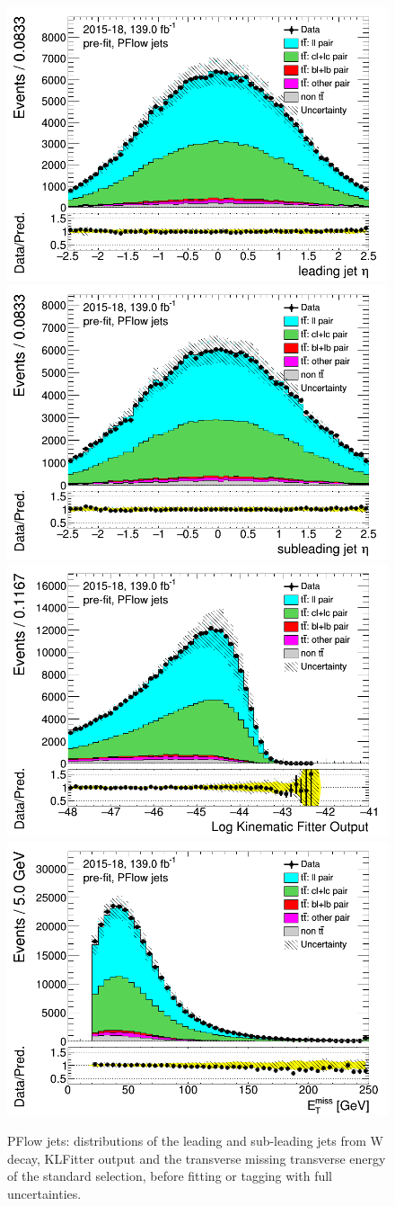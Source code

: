 \documentclass[letterpaper,12pt]{article}
\begin{document}
\label{sec:appendix_standard_selection}
\newpage	
\begin{figure}[H]
\includegraphics[width=.45\textwidth]{FTAG_plots/pretagNoRwwithouthighpTPFlowall/DataMC_h_J0_eta.png}
\includegraphics[width=.45\textwidth]{FTAG_plots/pretagNoRwwithouthighpTPFlowall/DataMC_h_J1_eta.png}\\
\includegraphics[width=.45\textwidth]{FTAG_plots/pretagNoRwwithouthighpTPFlowall/DataMC_h_LLR.png}
\includegraphics[width=.45\textwidth]{FTAG_plots/pretagNoRwwithouthighpTPFlowall/DataMC_h_MET.png}\\

\caption{PFlow jets: distributions of the leading and sub-leading jets 
from W decay, KLFitter output and the transverse missing transverse 
energy of the standard selection, before fitting or tagging with 
full uncertainties.} \label{fig:standard_jets_PFlow}
\end{figure}
\end{document}
